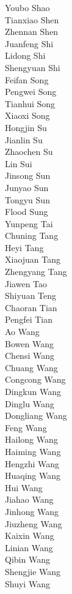 Youbo Shao\\
Tianxiao Shen\\
Zhennan Shen\\
Juanfeng Shi\\
Lidong Shi\\
Shengyuan Shi\\
Feifan Song\\
Pengwei Song\\
Tianhui Song\\
Xiaoxi Song\\
Hongjin Su\\
Jianlin Su\\
Zhaochen Su\\
Lin Sui\\
Jinsong Sun\\
Junyao Sun\\
Tongyu Sun\\
Flood Sung\\
Yunpeng Tai\\
Chuning Tang\\
Heyi Tang\\
Xiaojuan Tang\\
Zhengyang Tang\\
Jiawen Tao\\
Shiyuan Teng\\
Chaoran Tian\\
Pengfei Tian\\
Ao Wang\\
Bowen Wang\\
Chensi Wang\\
Chuang Wang\\
Congcong Wang\\
Dingkun Wang\\
Dinglu Wang\\
Dongliang Wang\\
Feng Wang\\
Hailong Wang\\
Haiming Wang\\
Hengzhi Wang\\
Huaqing Wang\\
Hui Wang\\
Jiahao Wang\\
Jinhong Wang\\
Jiuzheng Wang\\
Kaixin Wang\\
Linian Wang\\
Qibin Wang\\
Shengjie Wang\\
Shuyi Wang\\
